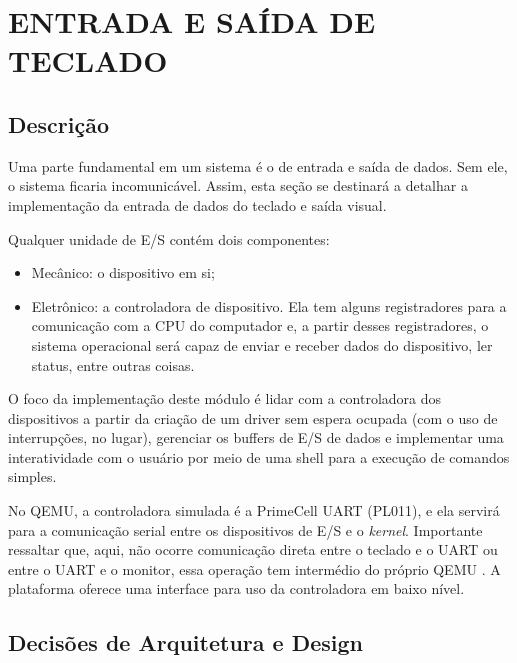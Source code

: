 \chapter{ENTRADA E SAÍDA DE TECLADO}


\section{Descrição}



Uma parte fundamental em um sistema é o de entrada e saída de dados. Sem ele, o sistema ficaria incomunicável. Assim, esta seção se destinará a detalhar a implementação da entrada de dados do teclado e saída visual.

Qualquer unidade de E/S contém dois componentes:
\begin{itemize}
    \item Mecânico: o dispositivo em si;
    \item Eletrônico: a controladora de dispositivo. Ela tem alguns registradores para a comunicação com a CPU do computador e, a partir desses registradores, o sistema operacional será capaz de enviar e receber dados do dispositivo, ler status, entre outras coisas.
\end{itemize}

O foco da implementação deste módulo é lidar com a controladora dos dispositivos a partir da criação de um driver sem espera ocupada (com o uso de interrupções, no lugar), gerenciar os buffers de E/S de dados e implementar uma interatividade com o usuário por meio de uma shell para a execução de comandos simples.

No QEMU, a controladora simulada é a PrimeCell UART (PL011), e ela servirá para a comunicação serial entre os dispositivos de E/S e o \textit{kernel}. Importante ressaltar que, aqui, não ocorre comunicação direta entre o teclado e o UART ou entre o UART e o monitor, essa operação tem intermédio do próprio QEMU \cite{ekasiswanto:qemu-uart}. A plataforma oferece uma interface para uso da controladora em baixo nível.



\section{Decisões de Arquitetura e Design}



